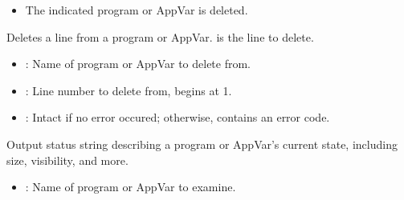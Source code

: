 \documentclass[letterpaper,10pt,english]{sphinxmanual}
\begin{document}
\begin{description}
\begin{description}
\begin{itemize}
\end{itemize}

\begin{itemize}
\item {} 
\sphinxAtStartPar
The indicated program or AppVar is deleted.

\end{itemize}

\end{description}

\sphinxAtStartPar
Deletes a line from a program or AppVar.  is the line to delete.
\begin{description}
\begin{itemize}
\item {} 
\sphinxAtStartPar
{}: Name of program or AppVar to delete from.

\item {} 
\sphinxAtStartPar
{}: Line number to delete from, begins at 1.

\end{itemize}

\begin{itemize}
\item {} 
\sphinxAtStartPar
{}: Intact if no error occured; otherwise, contains an error code.

\end{itemize}

\end{description}

\sphinxAtStartPar
Output status string describing a program or AppVar’s current state, including size, visibility, and more.
\begin{description}
\begin{itemize}
\item {} 
\sphinxAtStartPar
{}: Name of program or AppVar to examine.

\end{itemize}


\end{description}
\end{description}
\end{document}
